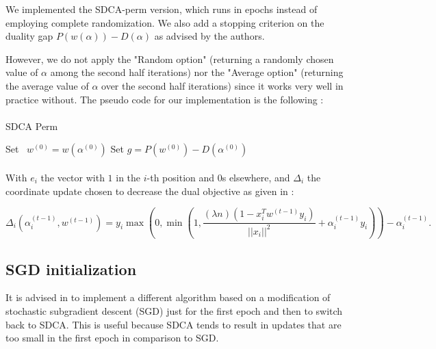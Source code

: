 \documentclass[10pt,a4paper]{article}
\begin{document}
We implemented the SDCA-perm version, which runs in epochs instead of employing complete randomization. We also add a stopping criterion on the duality gap $P(w(\alpha)) - D(\alpha)$ as advised by the authors. 


However, we do not apply the "Random option" (returning a randomly chosen value of $\alpha$ among the second half iterations) nor the "Average option" (returning the average value of $\alpha$ over the second half iterations) since it works very well in practice without. The pseudo code for our implementation is the following : 

\paragraph{}
\begin{algorithm}[H]
\caption{SDCA Perm}
\SetAlgoLined
{}
Set ~$w^{(0)} = w(\alpha^{(0)})$\;
Set $g= P(w^{(0)} ) - D(\alpha^{(0)})$\;

\end{algorithm}

\paragraph{}
With $e_i$ the vector with $1$ in the $i$-th position and $0$s elsewhere, and $\Delta_i$ the coordinate update chosen to decrease the dual objective as given in \cite{1}:

$$\Delta_i (\alpha_i^{(t-1)}, w^{(t-1)}) = y_i \max \left ( 0, \min \left ( 1, \frac{(\lambda n) (1 - x_i^Tw^{(t-1)}y_i)}{||x_i||^2} + \alpha_i^{(t-1)}y_i \right ) \right ) - \alpha_i^{(t-1)}.$$


\subsection{SGD initialization}

It is advised in \cite{1} to implement a different algorithm based on a modification of stochastic subgradient descent (SGD) just for the first epoch and then to switch back to SDCA. This is useful because SDCA tends to result in updates that are too small in the first epoch in comparison to SGD. 
\end{document}
